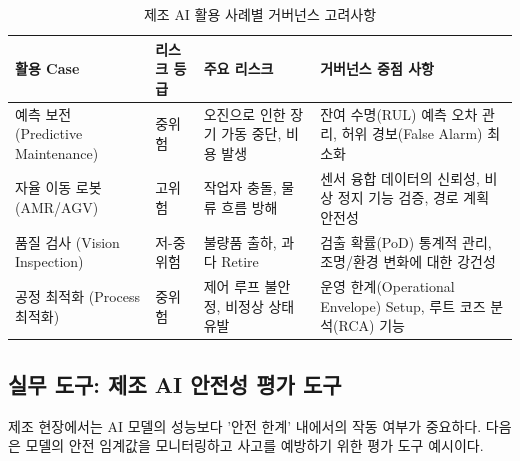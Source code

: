 \begin{table}[htbp]
\centering
\caption{제조 AI 활용 사례별 거버넌스 고려사항}
\label{tab:manufacturing_ai_cases}
\begin{tabularx}{\textwidth}{p{2.5cm}p{2.5cm}p{2.5cm}X}
\toprule
\textbf{활용 Case} & \textbf{리스크 등급} & \textbf{주요 리스크} & \textbf{거버넌스 중점 사항} \\
\midrule
예측 보전 (Predictive Maintenance) & 중위험 & 오진으로 인한 장기 가동 중단, 비용 발생 & 잔여 수명(RUL) 예측 오차 관리, 허위 경보(False Alarm) 최소화 \\
\midrule
자율 이동 로봇 (AMR/AGV) & 고위험 & 작업자 충돌, 물류 흐름 방해 & 센서 융합 데이터의 신뢰성, 비상 정지 기능 검증, 경로 계획 안전성 \\
\midrule
품질 검사 (Vision Inspection) & 저-중위험 & 불량품 출하, 과다 Retire & 검출 확률(PoD) 통계적 관리, 조명/환경 변화에 대한 강건성 \\
\midrule
공정 최적화 (Process 최적화) & 중위험 & 제어 루프 불안정, 비정상 상태 유발 & 운영 한계(Operational Envelope) Setup, 루트 코즈 분석(RCA) 기능 \\
\bottomrule
\end{tabularx}
\end{table}


\subsection{실무 도구: 제조 AI 안전성 평가 도구}
\label{sec:5.4.3}

제조 현장에서는 AI 모델의 성능보다 '안전 한계' 내에서의 작동 여부가 중요하다. 다음은 모델의 안전 임계값을 모니터링하고 사고를 예방하기 위한 평가 도구 예시이다.

